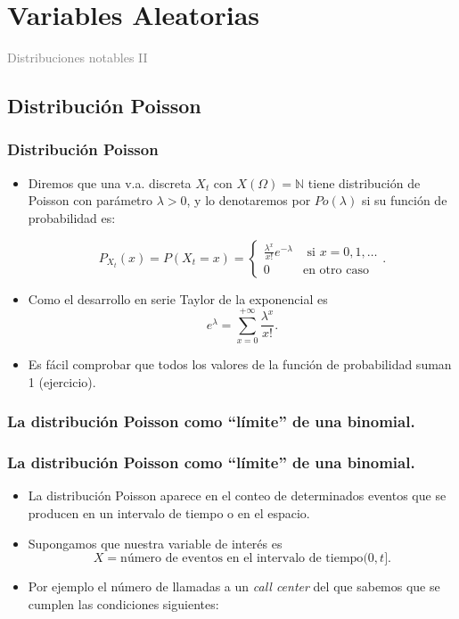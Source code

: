 \documentclass[handout]{beamer}\usepackage[]{graphicx}\usepackage[]{color}
\title[\red{Matemáticas III GINF}]{}
\author[]{R. Alberich}
\date{}
\newcommand{\gray}[1]{\textcolor{gray}{#1}}
\newcommand{\NN}{\mathbb{N}}
\theoremstyle{plain}
\theoremstyle{definition}
\begin{document}
\beamertemplatedotitem

\lstset{breaklines=true}
\lstset{basicstyle=\ttfamily}


\section{Variables Aleatorias}

\begin{frame}
\vfill
\begin{center}
\gray{\LARGE Distribuciones notables II }
\end{center}
\vfill
\end{frame}

\subsection{Distribución Poisson}

\begin{frame}
\frametitle{Distribución Poisson}
\begin{itemize}
\item  Diremos que una v.a. discreta $X_t$ con $X(\Omega)=\NN$ tiene
distribución de Poisson con parámetro $\lambda>0$, y lo denotaremos
por $Po(\lambda)$ si su función de probabilidad es:

$$P_{X_t}(x)=P(X_t=x)=
\left\{\begin{array}{ll}
\frac{\lambda^x}{x!} e^{-\lambda}& \mbox{ si } x=0,1,\ldots\\
0 & \mbox{en otro caso}\end{array}\right..$$

\item Como el desarrollo en serie  Taylor de la exponencial es 
$$e^{\lambda}=\sum_{x=0}^{+\infty} \frac{\lambda^x}{x!}.$$
\item Es fácil comprobar que  todos los valores de la función de probabilidad suman 1 (ejercicio).
\end{itemize}
\end{frame}


\subsubsection{La distribución Poisson como ``límite'' de una binomial.}

\begin{frame}

\frametitle{La distribución Poisson como ``límite'' de una binomial.}

\begin{itemize}
\item La distribución Poisson aparece en el conteo de determinados  eventos que se
producen en un intervalo de tiempo o en el espacio.
\item Supongamos que nuestra variable de interés es  
$$X= \mbox{número de eventos en el intervalo de tiempo} (0,t].$$ 
\item Por ejemplo el número de
llamadas a un \textsl{call center} del que sabemos que se
cumplen las  condiciones siguientes:
\end{itemize}
\end{frame}
\end{document}
